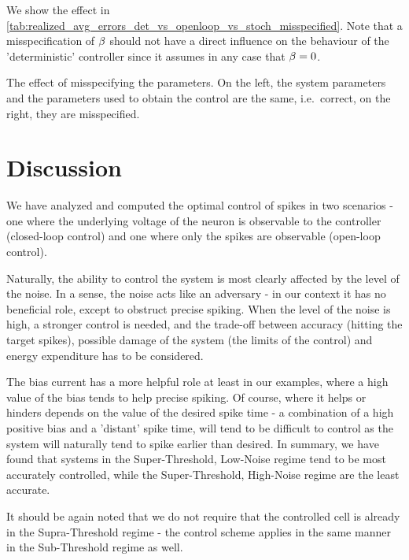 \documentclass[12pt]{iopart}
\begin{document}
We show the effect in
\cref{tab:realized_avg_errors_det_vs_openloop_vs_stoch_misspecified}. Note that
a misspecification of ${\beta}$ should not have a direct influence on the behaviour
of the 'deterministic' controller since it assumes in any case that ${\beta}=0$.
\begin{table}[h]
\begin{center}
 
 \caption{The effect of misspecifying the parameters. On the left, the
 system parameters and the parameters used to obtain the control are the
 same, i.e.\ correct, on the right, they are misspecified.}
\label{tab:realized_avg_errors_det_vs_openloop_vs_stoch_misspecified}
\end{center}
\end{table}


\section{Discussion}
We have analyzed and computed the optimal control of spikes in two scenarios -
one where the underlying voltage of the neuron is observable to the controller
(closed-loop control) and one where only the spikes are observable (open-loop
control).

Naturally, the ability to control the system is most clearly affected by the
level of the noise. In a sense, the noise acts like an adversary - in our
context it has no beneficial role, except to obstruct precise spiking.
When the level of the noise is high, a stronger control is needed, and
the trade-off between accuracy (hitting the target spikes), possible
damage of the system (the limits of the control) and energy expenditure
has to be considered.

The bias current has a more helpful role at least in our examples, where a
high value of the bias tends to help precise spiking. Of course, where it helps
or hinders depends on the value of the desired spike time - a combination of a
high positive bias and a 'distant' spike time, will tend to be difficult to
control as the system will naturally tend to spike earlier than desired.
In summary, we have found that systems in the Super-Threshold, Low-Noise regime
tend to be most accurately controlled, while the Super-Threshold, High-Noise
regime are the least accurate. 

It should be again noted that we do not require that the controlled cell is
already in the Supra-Threshold regime - the control scheme applies in the same
manner in the Sub-Threshold regime as well.
\end{document}
